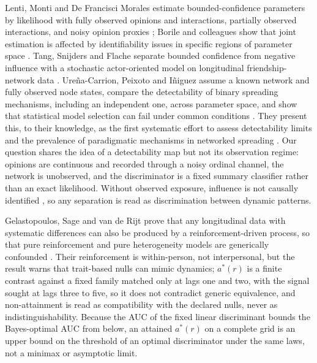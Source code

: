 Lenti, Monti and De Francisci Morales estimate bounded-confidence parameters by likelihood with fully observed opinions and interactions, partially observed interactions, and noisy opinion proxies \cite{lenti2024}; Borile and colleagues show that joint estimation is affected by identifiability issues in specific regions of parameter space \cite{borile2026}.
Tang, Snijders and Flache separate bounded confidence from negative influence with a stochastic actor-oriented model on longitudinal friendship-network data \cite{tang2025empirical}.
Ureña-Carrion, Peixoto and Iñiguez assume a known network and fully observed node states, compare the detectability of binary spreading mechanisms, including an independent one, across parameter space, and show that statistical model selection can fail under common conditions \cite{urena2026}.
They present this, to their knowledge, as the first systematic effort to assess detectability limits and the prevalence of paradigmatic mechanisms in networked spreading \cite{urena2026}.
Our question shares the idea of a detectability map but not its observation regime: opinions are continuous and recorded through a noisy ordinal channel, the network is unobserved, and the discriminator is a fixed summary classifier rather than an exact likelihood.
Without observed exposure, influence is not causally identified \cite{manski1993}, so any separation is read as discrimination between dynamic patterns.

Gelastopoulos, Sage and van de Rijt prove that any longitudinal data with systematic differences can also be produced by a reinforcement-driven process, so that pure reinforcement and pure heterogeneity models are generically confounded \cite{gelastopoulos2025}.
Their reinforcement is within-person, not interpersonal, but the result warns that trait-based nulls can mimic dynamics; $a^*(r)$ is a finite contrast against a fixed family matched only at lags one and two, with the signal sought at lags three to five, so it does not contradict generic equivalence, and non-attainment is read as compatibility with the declared nulls, never as indistinguishability.
Because the AUC of the fixed linear discriminant bounds the Bayes-optimal AUC from below, an attained $a^*(r)$ on a complete grid is an upper bound on the threshold of an optimal discriminator under the same laws, not a minimax or asymptotic limit.

